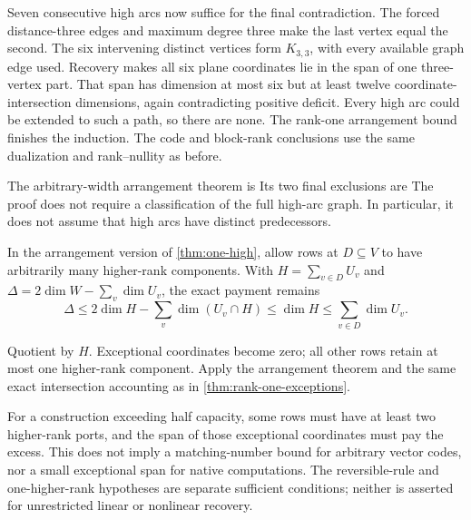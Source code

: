 \begin{outline}
Seven consecutive high arcs now suffice for the final contradiction.
The forced distance-three edges and maximum degree three make the last
vertex equal the second. The six intervening distinct vertices form
$K_{3,3}$, with every available graph edge used. Recovery makes all six
plane coordinates lie in the span of one three-vertex part. That span
has dimension at most six but at least twelve coordinate-intersection
dimensions, again contradicting positive deficit. Every high arc could
be extended to such a path, so there are none. The rank-one arrangement
bound finishes the induction. The code and block-rank conclusions use
the same dualization and rank--nullity as before.
\end{outline}

The arbitrary-width arrangement theorem is
Its two final exclusions are
The proof does not require a classification of the full high-arc graph.
In particular, it does not assume that high arcs have distinct predecessors.

\begin{corollary}\label{cor:one-high-exceptions}
In the arrangement version of \cref{thm:one-high}, allow rows at
$D\subseteq V$ to have arbitrarily many higher-rank components. With
$H=\sum_{v\in D}U_v$ and $\Delta=2\dim W-\sum_v\dim U_v$, the exact
payment remains
\[
 \Delta\leq2\dim H-\sum_v\dim(U_v\cap H)
 \leq\dim H\leq\sum_{v\in D}\dim U_v.
\]
\end{corollary}
\begin{outline}
Quotient by $H$. Exceptional coordinates become zero; all other rows retain
at most one higher-rank component. Apply the arrangement theorem and
the same exact intersection accounting as in
\cref{thm:rank-one-exceptions}.
\end{outline}

For a construction exceeding half capacity, some rows must have at least
two higher-rank ports, and the span of those exceptional coordinates must
pay the excess. This does not imply a matching-number bound for arbitrary
vector codes, nor a small exceptional span for native computations.
The reversible-rule and one-higher-rank hypotheses are separate sufficient
conditions; neither is asserted for unrestricted linear or nonlinear
recovery.
